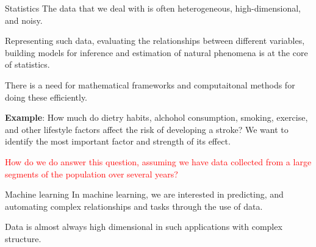 \documentclass[aspectratio=169]{beamer}
\let\olditem\item
\renewcommand{\item}{\setlength{\itemsep}{\fill}\olditem}
\begin{document}
  



\begin{frame}{Statistics}
  The data that we deal with is often heterogeneous, high-dimensional, and noisy.
  \vspace{0.2cm}
  
  Representing such data, evaluating the relationships between different variables, building models for inference and estimation of natural phenomena is at the core of statistics. 
  \vspace{0.2cm}
  
  There is a need for mathematical frameworks and computaitonal methods for doing these efficiently.
  \vspace{0.2cm}
  
  \textbf{Example}: How much do dietry habits, alchohol consumption, smoking, exercise, and other lifestyle factors affect the risk of developing a stroke? We want to identify the most important factor and strength of its effect.

  \textcolor{red}{How do we do answer this question, assuming we have data collected from a large segments of the population over several years?}
\end{frame}


\begin{frame}{Machine learning}
  In machine learning, we are interested in predicting, and automating complex relationships and tasks through the use of data.
  \vspace{0.2cm}
  
  Data is almost always high dimensional in such applications with complex structure.
  \vspace{0.2cm}  
\end{frame}


  
\end{document}
